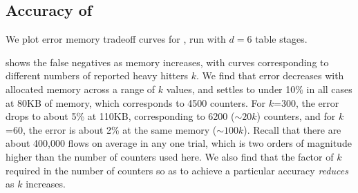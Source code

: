 

\subsection{Accuracy of \TheSystem}
\label{subsec:isolatedEvaluation}

We plot error \vs memory tradeoff curves for \TheSystem, run with $d=6$ table
stages.

  shows the false negatives as memory
increases, with curves corresponding to different numbers of reported heavy
hitters $k$. We find that error decreases with allocated memory across a range
of $k$ values, and settles to under 10\% in all cases at 80KB of memory, which
corresponds to 4500 counters.
%
For $k$=300, the error drops to about 5\% at 110KB, corresponding to 6200
($\sim20k$) counters, and for $k$=60, the error is about 2\% at the same memory
($\sim100k$).
%
Recall that there are about 400,000 flows on average in any one trial,
which is two orders of magnitude higher than the number of counters used here.
We also find that the factor of $k$ required in the number of counters so as to
achieve a particular accuracy {\em reduces} as $k$ increases.



